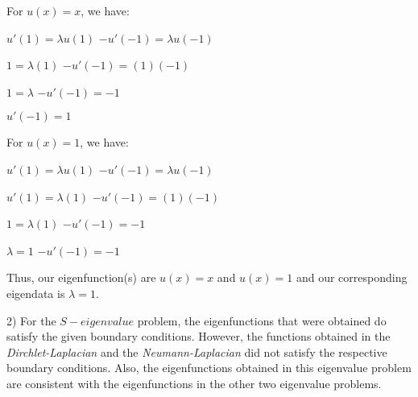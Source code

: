 \documentclass[executivepaper]{article}
\begin{document}
\begin{flushleft}
For $u(x)=x$, we have:

\begin{center}

$u'(1)=\lambda u(1)$  \quad \quad \quad $-u'(-1)=\lambda u(-1)$

$1=\lambda (1)$ \quad \quad \quad $-u'(-1)=(1)(-1)$

$1=\lambda$ \quad \quad \quad $-u'(-1)=-1$

\quad \quad \quad $u'(-1)=1$

\end{center}

For $u(x)=1$, we have:

\begin{center}

$u'(1)=\lambda u(1)$  \quad \quad \quad $-u'(-1)=\lambda u(-1)$

$u'(1)=\lambda(1)$  \quad \quad \quad $-u'(-1)=(1)(-1)$

$1=\lambda (1)$ \quad \quad \quad $-u'(-1)=-1$

$\lambda=1$ \quad \quad \quad $-u'(-1)=-1$

\end{center}

Thus, our eigenfunction(s) are $u(x)=x$ and $u(x)=1$ and our corresponding eigendata is $\lambda=1$.

\end{flushleft}

\begin{flushleft}

2) For the $S-eigenvalue$ problem, the eigenfunctions that were obtained do satisfy the given boundary conditions. However, the functions obtained in the \textit{Dirchlet-Laplacian} and the \textit{Neumann-Laplacian} did not satisfy the respective boundary conditions. Also, the eigenfunctions obtained in this eigenvalue problem are consistent with the eigenfunctions in the other two eigenvalue problems.

\end{flushleft}

\pagebreak

\vspace*{-40mm}
\end{document}
